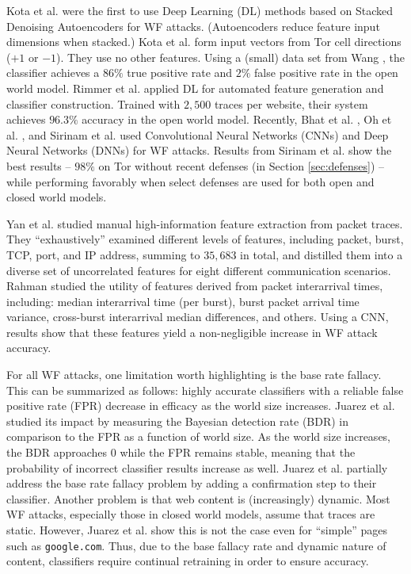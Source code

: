 \documentclass[runningheads]{llncs}
\begin{document}
\begin{description}

Kota et al. \cite{abe2016fingerprinting} were the first to use Deep Learning (DL) methods based on Stacked
Denoising Autoencoders for WF attacks. (Autoencoders reduce feature input dimensions when stacked.)
Kota et al. form input vectors from Tor cell directions ($+1$ or $-1$). They use no other features.
Using a (small) data set from Wang \cite{wang2016website}, the classifier achieves a $86\%$ true positive
rate and $2\%$ false positive rate in the open world model. Rimmer et al. \cite{rimmer2018automated}
applied DL for automated feature generation and classifier construction. Trained with $2,500$ traces per
website, their system achieves $96.3\%$ accuracy in the open world model.
Recently, Bhat et al. \cite{bhat2018var}, Oh et al. \cite{oh2017pfp}, and Sirinam et al. \cite{sirinam2018deep}
used Convolutional Neural Networks (CNNs) and Deep Neural Networks (DNNs) for WF attacks. Results from
Sirinam et al. show the best results -- $98\%$ on Tor without recent defenses (in Section \ref{sec:defenses}) --
while performing favorably when select defenses are used for both open and closed world models.

\end{description}

Yan et al. \cite{yan2018feature} studied manual high-information feature extraction from packet traces.
They ``exhaustively'' examined different levels of features, including packet, burst, TCP, port, and IP address,
summing to $35,683$ in total, and distilled them into a diverse set of uncorrelated features for eight
different communication scenarios. Rahman \cite{rahman2018using} studied the utility of features derived
from packet interarrival times, including: median interarrival time (per burst), burst packet arrival
time variance, cross-burst interarrival median differences, and others. Using a CNN, results show that
these features yield a non-negligible increase in WF attack accuracy.

For all WF attacks, one limitation worth highlighting is the base rate fallacy. This can be summarized
as follows: highly accurate classifiers with a reliable false positive rate (FPR) decrease in
efficacy as the world size increases. Juarez et al. \cite{juarez2014critical} studied its impact by
measuring the Bayesian detection rate (BDR) in comparison to the FPR as a function of world size.
As the world size increases, the BDR approaches $0$ while the FPR remains stable, meaning that the probability
of incorrect classifier results increase as well. Juarez et al. partially address the base rate fallacy
problem by adding a confirmation step to their classifier.
Another problem is that web content is (increasingly) dynamic. Most WF attacks, especially those in closed
world models, assume that traces are static. However, Juarez et al. \cite{juarez2014critical} show
this is not the case even for ``simple'' pages such as {\tt google.com}. Thus, due to the base fallacy
rate and dynamic nature of content, classifiers require continual retraining in order to ensure accuracy.
\end{document}

